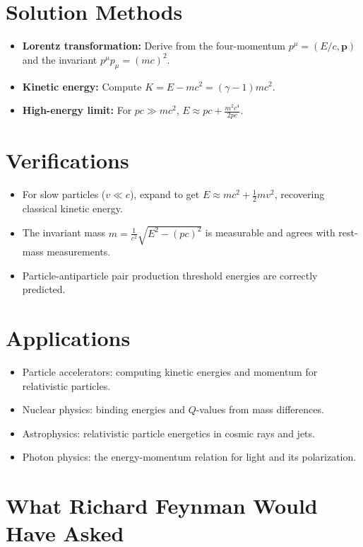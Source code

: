 \section*{Solution Methods}

\begin{itemize}
    \item \textbf{Lorentz transformation:} Derive from the four-momentum $p^\mu = (E/c, \mathbf{p})$ and the invariant $p^\mu p_\mu = (mc)^2$.
    \item \textbf{Kinetic energy:} Compute $K = E - mc^2 = (\gamma - 1)mc^2$.
    \item \textbf{High-energy limit:} For $pc \gg mc^2$, $E \approx pc + \frac{m^2c^4}{2pc}$.
\end{itemize}
\section*{Verifications}

\begin{itemize}
    \item For slow particles ($v \ll c$), expand to get $E \approx mc^2 + \frac{1}{2}mv^2$, recovering classical kinetic energy.
    \item The invariant mass $m = \frac{1}{c^2}\sqrt{E^2 - (pc)^2}$ is measurable and agrees with rest-mass measurements.
    \item Particle-antiparticle pair production threshold energies are correctly predicted.
\end{itemize}
\section*{Applications}

\begin{itemize}
    \item Particle accelerators: computing kinetic energies and momentum for relativistic particles.
    \item Nuclear physics: binding energies and $Q$-values from mass differences.
    \item Astrophysics: relativistic particle energetics in cosmic rays and jets.
    \item Photon physics: the energy-momentum relation for light and its polarization.
\end{itemize}
\section*{What Richard Feynman Would Have Asked}

